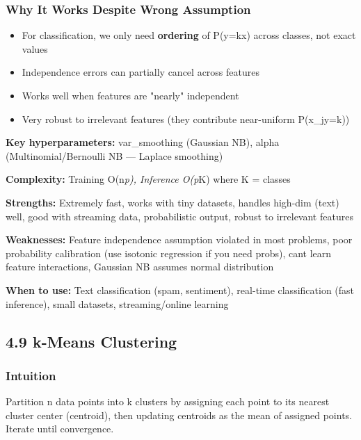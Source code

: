 \documentclass[11pt]{article}
\providecommand{\tightlist}{\setlength{\itemsep}{1pt}\setlength{\parskip}{0pt}}
\begin{document}
\subsubsection{Why It Works Despite Wrong Assumption}\label{why-it-works-despite-wrong-assumption}

\begin{itemize}
\tightlist
\item
  For classification, we only need \textbf{ordering} of P(y=k\textbar x) across classes, not exact values
\item
  Independence errors can partially cancel across features
\item
  Works well when features are "nearly" independent
\item
  Very robust to irrelevant features (they contribute near-uniform P(x\_j\textbar y=k))
\end{itemize}

\textbf{Key hyperparameters:} var\_smoothing (Gaussian NB), alpha (Multinomial/Bernoulli NB --- Laplace smoothing)

\textbf{Complexity:} Training O(n\emph{p), Inference O(p}K) where K = classes

\textbf{Strengths:} Extremely fast, works with tiny datasets, handles high-dim (text) well, good with streaming data, probabilistic output, robust to irrelevant features

\textbf{Weaknesses:} Feature independence assumption violated in most problems, poor probability calibration (use isotonic regression if you need probs), can\textquotesingle t learn feature interactions, Gaussian NB assumes normal distribution

\textbf{When to use:} Text classification (spam, sentiment), real-time classification (fast inference), small datasets, streaming/online learning

\subsection{4.9 k-Means Clustering}\label{49-k-means-clustering}

\subsubsection{Intuition}\label{intuition-8}

Partition n data points into k clusters by assigning each point to its nearest cluster center (centroid), then updating centroids as the mean of assigned points. Iterate until convergence.
\end{document}
